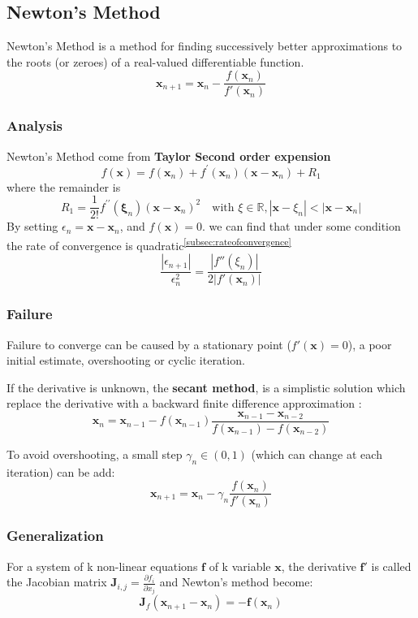 \documentclass[twocolumn]{article}
\numberwithin{equation}{section}
\begin{document}
 
 
	\subsection{Newton's Method}
Newton's Method is a method for finding successively better approximations to the roots (or zeroes) of a real-valued differentiable function.
$$\mathbf{x}_{n+1} = \mathbf{x}_n - \frac{f(\mathbf{x}_n)}{f'(\mathbf{x}_n)} $$

		\subsubsection{Analysis}
Newton's Method come from  \textbf{Taylor Second order expension}
$$f(\mathbf{x}) = f(\mathbf{x}_n) + f^\prime(\mathbf{x}_n)(\mathbf{x} - \mathbf{x}_n) + R_1  $$
where the remainder is 
$$R_1 = \frac{1}{2!}f^{\prime\prime}(\mathbf{\xi}_n)(\mathbf{x} - \mathbf{x}_n)^{2} \quad \text{with } \xi\in \mathbb{R}, |\mathbf{x} - \xi_n| < |\mathbf{x}-\mathbf{x}_n|$$
By setting $\epsilon_n=\mathbf{x-x}_n$, and $f(\mathbf{x})=0$. we can find that under some condition the rate of convergence is quadratic\textsuperscript{\ref{subsec:rateofconvergence}}
$$\frac{|\epsilon_{n+1}|}{\epsilon_n^2}=\frac{|f''(\xi_n)|}{2|f'(\mathbf{x}_n)|}$$


		\subsubsection{Failure}
Failure to converge can be caused by a stationary point ($f'(\mathbf{x})=0$), a poor initial estimate, overshooting or  cyclic iteration.

If the derivative is unknown, the \textbf{secant method},  is a simplistic solution which replace the derivative with a backward finite difference approximation :
$$ \mathbf{x}_n=\mathbf{x}_{n-1}-f(\mathbf{x}_{n-1})\frac{\mathbf{x}_{n-1}-\mathbf{x}_{n-2}}{f(\mathbf{x}_{n-1})-f(\mathbf{x}_{n-2})}$$

To avoid overshooting, a small step $ \gamma_n \in (0,1)$ (which can change at each iteration) can be add:
$$\mathbf{x}_{n+1} = \mathbf{x}_n - \gamma_n \frac{f(\mathbf{x}_n)}{f'(\mathbf{x}_n)}$$

		\subsubsection{Generalization}
For a system of k non-linear equations $\mathbf{f}$ of k variable $\mathbf{x}$, the derivative $\mathbf{f}'$ is called the Jacobian matrix $\mathbf J_{i,j} = \frac{\partial f_i}{\partial x_j}$ and Newton's method become:
$$\mathbf J_f (\mathbf{x}_{n+1} - \mathbf{x}_n) = -\mathbf{f}(\mathbf{x}_n)$$
\end{document}

